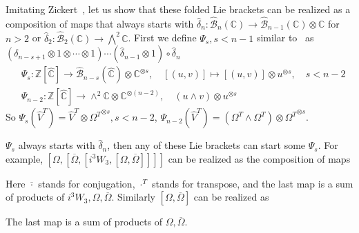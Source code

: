 Imitating Zickert~\cite{Zickert_HolomorphicPolylogarithmsAndBlochComplexes}, let us show that these folded Lie brackets can be realized as a composition of maps that always starts with $\widehat\delta_n:\widehat{\mathcal B}_n(\mathbb C)\to\widehat{\mathcal B}_{n-1}(\mathbb C)\otimes\mathbb C$ for $n>2$ or $\widehat\delta_2:\widehat{\mathcal B}_2(\mathbb C)\to\bigwedge^2\mathbb C$. First we define $\Psi_s, s<n-1$ similar to~\cite{Zickert_HolomorphicPolylogarithmsAndBlochComplexes} as $(\delta_{n-s+1}\otimes1\otimes\cdots\otimes1)\cdots(\widehat\delta_{n-1}\otimes1)\circ\widehat\delta_n$
\begin{equation}
\begin{aligned}
&\Psi_s:\mathbb Z[\widehat{\mathbb C}]\to\widehat{\mathcal B}_{n-s}(\widehat{\mathbb C})\otimes\mathbb C^{\otimes s},\quad[(u,v)]\mapsto[(u,v)]\otimes u^{\otimes s},\quad s<n-2\\
&\Psi_{n-2}:\mathbb Z[\widehat{\mathbb C}]\to\wedge^2\mathbb C\otimes\mathbb C^{\otimes(n-2)},\quad(u\wedge v)\otimes u^{\otimes s}
\end{aligned}
\end{equation}
So $\Psi_s(\widehat V^T)=\widehat V^T\otimes{\Omega^T}^{\otimes s}, s<n-2$, $\Psi_{n-2}(\widehat V^T)=(\Omega^T\wedge\Omega^T)\otimes{\Omega^T}^{\otimes s}$.

$\Psi_s$ always starts with $\widehat\delta_n$, then any of these Lie brackets can start some $\Psi_s$. For example, $[\Omega,[\overline\Omega,[i^3W_3,[\Omega,\overline\Omega]]]]$ can be realized as the composition of maps
\begin{center}
\end{center}
Here $\overline\cdot$ stands for conjugation, $\cdot^T$ stands for transpose, and the last map is a sum of products of $i^3W_3,\Omega,\overline\Omega$. Similarly $[\Omega,\overline\Omega]$ can be realized as
\begin{center}
\end{center}
The last map is a sum of products of $\Omega,\overline\Omega$.

